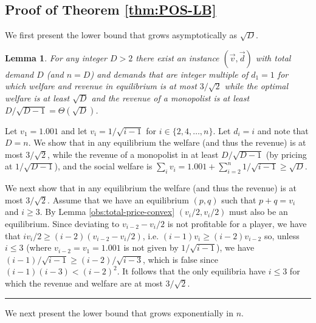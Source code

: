 \documentclass[11pt,a4paper]{article}
\newcommand{\qed}{\rule{1.5mm}{2mm}\vspace{0.1in}}
\newenvironment{proof}{\par\noindent{\bf Proof:}}{\qed}
\newtheorem{lemma}[theorem]{Lemma}
\begin{document}
\subsection{Proof of Theorem \ref{thm:POS-LB}}
\label{sec:proof-pos-lb}

We first present the lower bound that grows asymptotically as $\sqrt{D}$.


\begin{lemma}
	\label{lem:POS-LB-D}
	For any integer $D>2$ there exist an instance $(\vec{v},\vec{d})$ with total demand $D$ (and $n=D$)
	and demands that are integer multiple of $d_1=1$ for which
	welfare and revenue in equilibrium is at most $3/\sqrt{2}$ while the optimal welfare is at least $\sqrt{D}$ and
	the revenue of a monopolist is  at least $D/\sqrt{D-1}= \Theta(\sqrt{D})$.
\end{lemma}	
\begin{proof}
	Let $v_1= 1.001$ and let $v_i = 1/\sqrt{i-1}$ for $i\in \{2,4,\ldots,n  \}$. Let $d_i=i$ and note that $D=n$.
	We show that in any equilibrium the welfare (and thus the revenue) is at most $3/\sqrt{2}$,
	while the revenue of a monopolist in at least $D/\sqrt{D-1}$ (by pricing at $1/\sqrt{D-1}$), and the social welfare is
	$\sum_i v_i = 1.001+\sum_{i=2}^n 1/\sqrt{i-1} \geq \sqrt{D}$.
	
	We next show that in any equilibrium the welfare (and thus the revenue) is at most $3/\sqrt{2}$.
	Assume that we have an equilibrium $(p,q)$ such that $p+q=v_i$ and $i\geq 3$.
	By Lemma \ref{obs:total-price-convex} $(v_i/2, v_i/2)$ must also be an equilibrium.
	Since deviating to $v_{i-2}-v_i/2$ is not profitable for a player, we have that
	$iv_i/2 \ge (i-2)(v_{i-2}-v_i/2)$, i.e. $(i-1)v_i \ge (i-2)v_{i-2}$ so,
	unless $i \le 3$ (where $v_{i-2}=v_1=1.001$
	is not given by $1/\sqrt{i-1}$), we have $(i-1)/\sqrt{i-1} \ge (i-2)/\sqrt{i-3}$, which is false since
	$(i-1)(i-3) < (i-2)^2$. It follows that the only equilibria have $i \le 3$ for which the revenue and
	welfare are at most  $3/\sqrt{2}$.
\end{proof}

We next present the lower bound that  grows exponentially in $n$.
\end{document}

